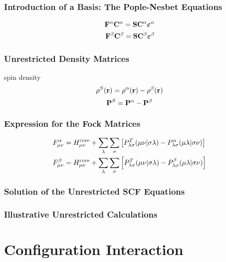 \documentclass[a4paper]{article}
\DeclareMathOperator{\core}{\mathrm{core}}
\numberwithin{equation}{section}
\begin{document}
\subsubsection{Introduction of a Basis: The Pople-Nesbet Equations}
\begin{align}
\vb{F}^\alpha \vb{C}^\alpha = \vb{S} \vb{C}^\alpha \bm\varepsilon^\alpha \\
\vb{F}^\beta \vb{C}^\beta = \vb{S} \vb{C}^\beta \bm\varepsilon^\beta
\end{align}

\subsubsection{Unrestricted Density Matrices}
spin density
\begin{equation}\label{key}
\rho^S(\vb{r}) = \rho^\alpha(\vb{r}) - \rho^\beta(\vb{r})
\end{equation}
\begin{equation}\label{key}
\vb{P}^S = \vb{P}^\alpha - \vb{P}^\beta
\end{equation}

\subsubsection{Expression for the Fock Matrices}
\begin{align}
F^\alpha_{\mu\nu} &= H^{\core}_{\mu\nu} + \sum_\lambda\sum_\sigma \qty[ P^T_{\lambda\sigma}(\mu\nu|\sigma\lambda) - P^\alpha_{\lambda\sigma}(\mu\lambda|\sigma\nu)] \\
F^\beta_{\mu\nu} &= H^{\core}_{\mu\nu} + \sum_\lambda\sum_\sigma \qty[ P^T_{\lambda\sigma}(\mu\nu|\sigma\lambda) - P^\beta_{\lambda\sigma}(\mu\lambda|\sigma\nu)]
\end{align}

\subsubsection{Solution of the Unrestricted SCF Equations}

\subsubsection{Illustrative Unrestricted Calculations}

\section{Configuration Interaction}
\end{document}
